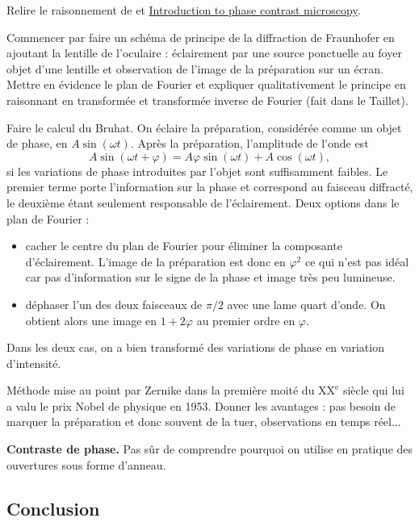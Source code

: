 Relire le raisonnement de \cite{Kastler1948} et \href{https://www.microscopyu.com/techniques/phase-contrast/introduction-to-phase-contrast-microscopy}{Introduction to phase contrast microscopy}.

Commencer par faire un schéma de principe de la diffraction de Fraunhofer en ajoutant la lentille de l'oculaire \cite{Faget1962} : éclairement par une source ponctuelle au foyer objet d'une lentille et observation de l'image de la préparation sur un écran.
Mettre en évidence le plan de Fourier et expliquer qualitativement le principe en raisonnant en transformée et transformée inverse de Fourier (fait dans le Taillet).

Faire le calcul du Bruhat.
On éclaire la préparation, considérée comme un objet de phase, en $A\sin(\omega t)$.
Après la préparation, l'amplitude de l'onde est 
\begin{equation}
A\sin(\omega t +\varphi) = A\varphi\sin(\omega t) + A\cos(\omega t),
\end{equation}
si les variations de phase introduites par l'objet sont suffisamment faibles.
Le premier terme porte l'information sur la phase et correspond au faisceau diffracté, le deuxième étant seulement responsable de l'éclairement.
Deux options dans le plan de Fourier :
\begin{itemize}
\item cacher le centre du plan de Fourier pour éliminer la composante d'éclairement.
L'image de la préparation est donc en $\varphi^2$ ce qui n'est pas idéal car pas d'information sur le signe de la phase et image très peu lumineuse.
\item déphaser l'un des deux faisceaux de $\pi/2$ avec une lame quart d'onde.
On obtient alors une image en $1+2\varphi$ au premier ordre en $\varphi$.
\end{itemize}
Dans les deux cas, on a bien transformé des variations de phase en variation d'intensité.

Méthode mise au point par Zernike dans la première moité du $\mathrm{XX^e}$ siècle qui lui a valu le prix Nobel de physique en 1953.
Donner les avantages : pas besoin de marquer la préparation et donc souvent de la tuer, observations en temps réel...

\begin{slide}
\textbf{Contraste de phase.}
Pas sûr de comprendre pourquoi on utilise en pratique des ouvertures sous forme d'anneau.
\end{slide}

\subsection*{Conclusion}

